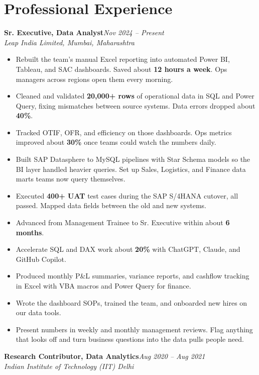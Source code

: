 \documentclass[10pt, letterpaper]{article}
\newcommand{\role}[3]{%
  \vspace{2pt}%
  {\bfseries #1}\hfill{\small\color{muted}\textit{#3}}\\[-2pt]%
  {\small\color{muted}\textit{#2}}%
}
\begin{document}
\section{Professional Experience}

\role{Sr. Executive, Data Analyst}{Leap India Limited, Mumbai, Maharashtra}{Nov 2024 -- Present}

\begin{itemize}
  \item Rebuilt the team's manual Excel reporting into automated Power BI, Tableau, and SAC dashboards. Saved about \textbf{12 hours a week}. Ops managers across regions open them every morning.
  \item Cleaned and validated \textbf{20,000+ rows} of operational data in SQL and Power Query, fixing mismatches between source systems. Data errors dropped about \textbf{40\%}.
  \item Tracked OTIF, OFR, and efficiency on those dashboards. Ops metrics improved about \textbf{30\%} once teams could watch the numbers daily.
  \item Built SAP Datasphere to MySQL pipelines with Star Schema models so the BI layer handled heavier queries. Set up Sales, Logistics, and Finance data marts teams now query themselves.
  \item Executed \textbf{400+ UAT} test cases during the SAP S/4HANA cutover, all passed. Mapped data fields between the old and new systems.
  \item Advanced from Management Trainee to Sr. Executive within about \textbf{6 months}.
  \item Accelerate SQL and DAX work about \textbf{20\%} with ChatGPT, Claude, and GitHub Copilot.
  \item Produced monthly P\&L summaries, variance reports, and cashflow tracking in Excel with VBA macros and Power Query for finance.
  \item Wrote the dashboard SOPs, trained the team, and onboarded new hires on our data tools.
  \item Present numbers in weekly and monthly management reviews. Flag anything that looks off and turn business questions into the data pulls people need.
\end{itemize}

\vspace{1pt}

\role{Research Contributor, Data Analytics}{Indian Institute of Technology (IIT) Delhi}{Aug 2020 -- Aug 2021}
\end{document}
